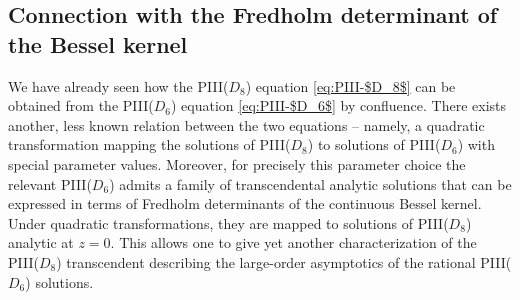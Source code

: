 \documentclass[pdftex]{sigma}
\numberwithin{equation}{section}
\begin{document}
\subsection{Connection with the Fredholm determinant of the Bessel kernel}
\label{sec:Bessel-determinant}
 We have already seen how the PIII($D_8$) equation \eqref{eq:PIII-$D_8$} can be obtained from the PIII($D_6$) equation \eqref{eq:PIII-$D_6$} by confluence. There exists another, less known relation between the two equations -- namely, a quadratic transformation mapping the solutions of PIII($D_8$) to solutions of PIII($D_6$) with special parameter values. Moreover, for precisely this parameter choice the relevant PIII($D_6$) admits a family of transcendental analytic solutions that can be expressed in terms of Fredholm determinants of the continuous Bessel kernel. Under quadratic transformations, they are mapped to solutions of PIII($D_8$) analytic at $z=0$. This allows one to give yet another characterization of the PIII($D_8$) transcendent describing the large-order asymptotics of the rational PIII($D_6$)
 solutions.
\end{document}
